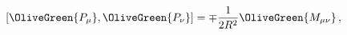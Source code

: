 \begin{equation}
  \left[ \OliveGreen{P_\mu },\OliveGreen{P_\nu }\right] =\mp \frac{1}{2R^2}\OliveGreen{M_{\mu \nu
  }}\,,
 \label{AdSalgebra}
\end{equation}


